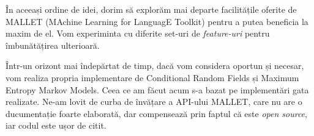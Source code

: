 În aceeași ordine de idei, dorim să explorăm mai departe facilitățile oferite de MALLET (MAchine Learning for LanguagE Toolkit) pentru a putea beneficia la maxim de el. Vom experiminta cu diferite set-uri de \textit{feature-uri} pentru îmbunătățirea ulterioară.

Într-un orizont mai îndepărtat de timp, dacă vom considera oportun și necesar, vom realiza propria implementare de Conditional Random Fields și Maximum Entropy Markov Models. Ceea ce am făcut acum s-a bazat pe implementări gata realizate. Ne-am lovit de curba de învățare a API-ului MALLET, care nu are o ducumentație foarte elaborată, dar compensează prin faptul că este \textit{open source}, iar codul este ușor de citit.




